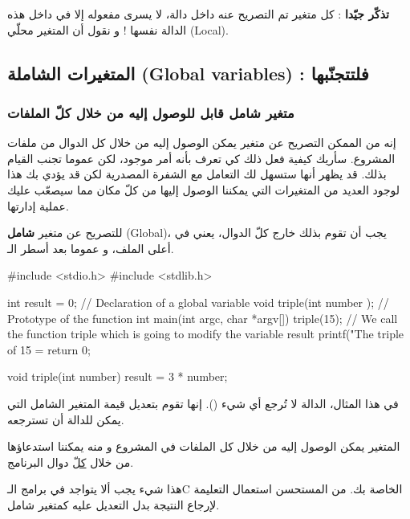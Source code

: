 \textbf{تذكّر جيّدا}
: كل متغير تم التصريح عنه داخل دالة، لا يسرى مفعوله إلا في داخل هذه الدالة نفسها ! و نقول أن المتغير محلّي
(\textenglish{Local}).

\subsection{المتغيرات الشاملة (\textenglish{Global variables}) : فلتتجنّبها}

\subsubsection{متغير شامل قابل للوصول إليه من خلال كلّ الملفات}

إنه من الممكن التصريح عن متغير يمكن الوصول إليه من خلال كل الدوال من ملفات المشروع.
سأريك كيفية فعل ذلك كي تعرف بأنه أمر موجود، لكن عموما تجنب القيام بذلك.
قد يظهر أنها ستسهل لك التعامل مع الشفرة المصدرية لكن قد يؤدي بك هذا لوجود العديد من المتغيرات التي يمكننا الوصول إليها من كلّ مكان مما سيصعّب عليك عملية إدارتها.

للتصريح عن متغير
\textbf{شامل}
(\textenglish{Global})،
يجب أن تقوم بذلك خارج كلّ الدوال، يعني في أعلى الملف، و عموما بعد أسطر الـ.

\begin{Csource}
#include <stdio.h>
#include <stdlib.h>

int result = 0; // Declaration of a global variable
void triple(int number ); // Prototype of the function
int main(int argc, char *argv[])
{
	triple(15); // We call the function triple which is going to modify the variable result
	printf("The triple of 15 = %
	return 0;
}

void triple(int number)
{
	result = 3 * number;
}
\end{Csource}

في هذا المثال، الدالة
لا تُرجع أي شيء
().
إنها تقوم بتعديل قيمة المتغير الشامل
التي يمكن للدالة
أن تسترجعه.

المتغير
يمكن الوصول إليه من خلال كل الملفات في المشروع و منه يمكننا استدعاؤها من خلال
\underline{كلّ}
دوال البرنامج.

\begin{warning}
  هذا شيء يجب ألا يتواجد في برامج الـ\textenglish{C}
الخاصة بك. من المستحسن استعمال التعليمة
لإرجاع النتيجة بدل التعديل عليه كمتغير شامل.
\end{warning}

